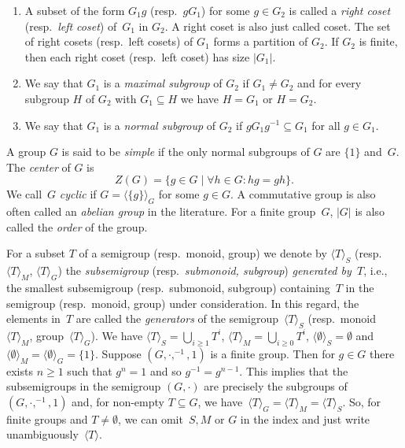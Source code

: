 \begin{enumerate}
	
	\item 
	A subset
	of the form $G_1g$ (resp.~$gG_1$) for some $g \in G_2$
	is called a \emph{right coset} (resp.~\emph{left coset}) 
	of~$G_1$ in $G_2$.
	A right coset is also just called coset.
	The set of right cosets (resp.~left cosets) of $G_1$
	forms a partition of $G_2$. If $G_2$ is finite,
	then each right coset (resp.~left coset) has size $|G_1|$.
	
	\item We say that $G_1$ is a \emph{maximal subgroup} 
	of $G_2$ if $G_1 \ne G_2$ and for every subgroup $H$ of $G_2$ with $G_1 \subseteq H$
	we have $H = G_1$ or $H = G_2$.
	
	\item We say that $G_1$ is a \emph{normal subgroup}
	of $G_2$ if $gG_1g^{-1} \subseteq G_1$ for all $g \in G_1$.
	
\end{enumerate}

\label{def:center} 
A group $G$ is said to be \emph{simple}
if the only normal subgroups of $G$ 
are $\{1\}$ and~$G$.
The \emph{center} of $G$ is 
\[
Z(G) = \{ g \in G \mid \forall h \in G \colon hg = gh \}.
\]
We call~$G$ \emph{cyclic} if $G = \langle \{g\} \rangle_G$ for some $g \in G$.
A commutative group is also often called an \emph{abelian group} in the literature.
For a finite group~$G$,
$|G|$ is also called the \emph{order} of the group.

\label{def:gensubstructures}

For a subset $T$ of a semigroup (resp.~monoid, group)
we denote by $\langle T \rangle_S$ (resp.~$\langle T \rangle_M$, $\langle T \rangle_G$)
the \emph{subsemigroup} (resp.~\emph{submonoid, subgroup}) \emph{generated by~$T$}, i.e., the 
smallest subsemigroup (resp.~submonoid, subgroup) containing~$T$ in the semigroup (resp.~monoid, group) under consideration.
In this regard, the elements in~$T$ are called the \emph{generators}
of the semigroup~$\langle T \rangle_S$ (resp.~monoid~$\langle T \rangle_M$, group~$\langle T \rangle_G$).
We have $\langle T \rangle_S = \bigcup_{i \ge 1} T^i$,
$\langle T \rangle_M = \bigcup_{i \ge 0} T^i$, $\langle \emptyset \rangle_S = \emptyset$
and $\langle \emptyset \rangle_M = \langle \emptyset \rangle_G = \{1\}$.
Suppose $(G, \cdot, ^{-1}, 1)$ is a finite group.
Then for $g \in G$ there exists $n \ge 1$ such that $g^n = 1$
and so $g^{-1} = g^{n-1}$. 
This implies that the subsemigroups in the semigroup $(G, \cdot)$
are precisely the subgroups of $(G, \cdot, ^{-1}, 1)$
and, for non-empty $T \subseteq G$, we have~$\langle T \rangle_G = \langle T \rangle_M = \langle T \rangle_S$.
So, for finite groups and $T \ne \emptyset$,
we can omit~$S, M$ or $G$  in the index and just write unambiguously~$\langle T \rangle$.

